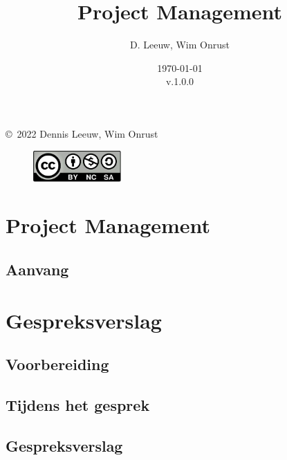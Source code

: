 \documentclass[a4paper,12pt,twoside,openright,titlepage]{book}
\author{D. Leeuw, Wim Onrust}
\title{Project Management}
\date{\today\\v.1.0.0}
\begin{document}

\maketitle

\copyright\ 2022 Dennis Leeuw, Wim Onrust\\

\begin{figure}
\includegraphics[width=0.3\textwidth]{CC-BY-SA-NC.png}
\end{figure}

\bigskip




\frontmatter
%
%

\tableofcontents

\mainmatter

\chapter{Project Management}

\section{Aanvang}


\chapter{Gespreksverslag}

\section{Voorbereiding}

\section{Tijdens het gesprek}

\section{Gespreksverslag}

\end{document}
